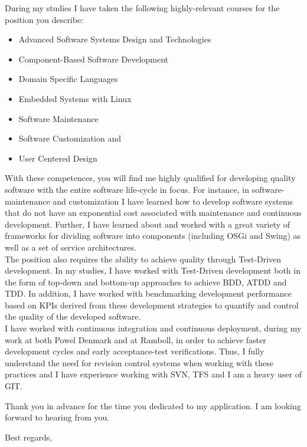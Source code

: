 \documentclass[10pt,a4paper]{altacv}
\begin{document}
During my studies I have taken the following highly-relevant courses for the position you describe:
\vspace{2mm} 
\begin{itemize}
	\item Advanced Software Systems Design and Technologies
	\item Component-Based Software Development
	\item Domain Specific Languages
	\item Embedded Systems with Linux
	\item Software Maintenance
	\item Software Customization and
	\item User Centered Design
\end{itemize}
\vspace{5mm} 
With these competences, you will find me highly qualified for developing quality software with the entire software life-cycle in focus.
For instance, in software- maintenance and customization I have learned how to develop software systems that do not have an exponential cost associated with maintenance and continuous development.
Further, I have learned about and worked with a great variety of frameworks for dividing software into components (including OSGi and Swing) as well as a set of service architectures.
\\
\vspace{5mm} 
The position also requires the ability to achieve quality through Test-Driven development.
In my studies, I have worked with Test-Driven development both in the form of top-down and bottom-up approaches to achieve BDD, ATDD and TDD.
In addition, I have worked with benchmarking development performance based on KPIs derived from these development strategies to quantify and control the quality of the developed software.
\\
\vspace{5mm} 
I have worked with continuous integration and continuous deployment, during my work at both Powel Denmark and at Ramboll, in order to achieve faster development cycles and early acceptance-test verifications.
Thus, I fully understand the need for revision control systems when working with these practices and I have experience working with SVN, TFS and I am a heavy user of GIT.

\vspace{5mm} 
Thank you in advance for the time you dedicated to my application. I am looking forward to hearing from you.


\vspace{5mm}
Best regards,\\
\end{document}
